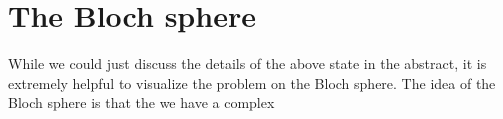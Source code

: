 \section{The Bloch sphere}

While we could just discuss the details of the above state in the abstract, it is extremely helpful to visualize the problem on the Bloch sphere. The idea of the Bloch sphere is that the we have a complex 